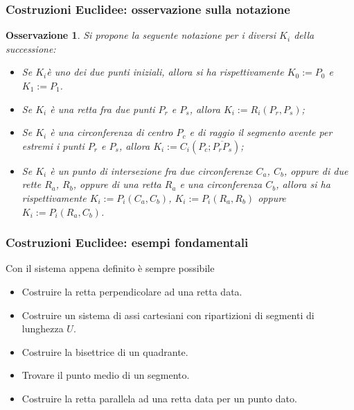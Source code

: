 \documentclass[11pt]{beamer}
\newtheorem{osservazione}{Osservazione}
\begin{document}
\begin{frame}
\frametitle{Costruzioni Euclidee: osservazione sulla notazione}
\begin{osservazione}
Si propone la seguente notazione per i diversi $K_{i}$ della successione: 
\begin{itemize}

\item Se $K_{i}$è uno dei due punti iniziali, allora si ha rispettivamente $K_{0} := P_{0}$ e $K_{1} := P_{1}$.

\item Se $K_{i}$ è una retta fra due punti $P_{r}$ e $P_{s}$, allora $K_{i} := R_{i} (P_{r}, P_{s})$;

\item Se $K_{i}$ è una circonferenza di centro $P_{c}$ e di raggio il segmento avente per estremi i punti $P_{r}$ e $P_{s}$, allora $K_{i} := C_{i} (P_{c}; \overline{P_{r}P_{s}})$;

\item Se $K_{i}$ è un punto di intersezione fra due circonferenze $C_{a}$, $C_{b}$, oppure di due rette $R_{a}$, $R_{b}$, oppure di una retta $R_{a}$ e una circonferenza $C_{b}$, allora si ha rispettivamente $K_{i} := P_{i} (C_{a},C_{b})$, $K_{i} := P_{i} (R_{a},R_{b})$ oppure $K_{i} := P_{i} (R_{a},C_{b})$.

\end{itemize}

\end{osservazione}

\end{frame}


\begin{frame}
\frametitle{Costruzioni Euclidee: esempi fondamentali}

Con il sistema appena definito è sempre possibile

\begin{itemize}

\item Costruire la retta perpendicolare ad una retta data.

\item Costruire un sistema di assi cartesiani con ripartizioni di segmenti di lunghezza $U$.

\item Costruire la bisettrice di un quadrante.

\item Trovare il punto medio di un segmento.

\item Costruire la retta parallela ad una retta data per un punto dato.

\end{itemize}

\end{frame}
\end{document}
